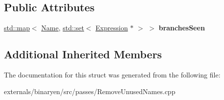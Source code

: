 \subsection*{Public Attributes}
\begin{DoxyCompactItemize}
\item 
\mbox{\label{structwasm_1_1_remove_unused_names_a7dd5cc1fccf220edbd6f2d045ec30625}} 
\mbox{\hyperlink{classstd_1_1map}{std\+::map}}$<$ \mbox{\hyperlink{structwasm_1_1_name}{Name}}, \mbox{\hyperlink{classstd_1_1set}{std\+::set}}$<$ \mbox{\hyperlink{classwasm_1_1_expression}{Expression}} $\ast$ $>$ $>$ {\bfseries branches\+Seen}
\end{DoxyCompactItemize}
\subsection*{Additional Inherited Members}


The documentation for this struct was generated from the following file\+:\begin{DoxyCompactItemize}
\item 
externals/binaryen/src/passes/Remove\+Unused\+Names.\+cpp\end{DoxyCompactItemize}
